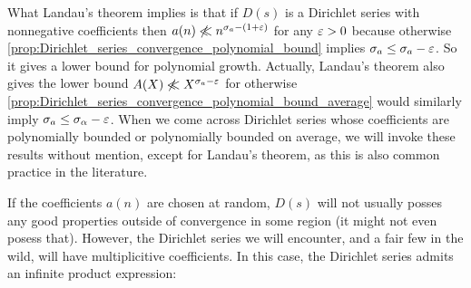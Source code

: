       What Landau's theorem implies is that if $D(s)$ is a Dirichlet series with nonnegative coefficients then $a(n) \not\ll n^{\sigma_{a}-(1+\varepsilon)}$ for any $\varepsilon > 0$ because otherwise \cref{prop:Dirichlet_series_convergence_polynomial_bound} implies $\sigma_{a} \le \sigma_{a}-\varepsilon$. So it gives a lower bound for polynomial growth. Actually, Landau's theorem also gives the lower bound $A(X) \not\ll X^{\sigma_{a}-\varepsilon}$ for otherwise \cref{prop:Dirichlet_series_convergence_polynomial_bound_average} would similarly imply $\sigma_{a} \le \sigma_{\alpha}-\varepsilon$. When we come across Dirichlet series whose coefficients are polynomially bounded or polynomially bounded on average, we will invoke these results without mention, except for Landau's theorem, as this is also common practice in the literature.

      If the coefficients $a(n)$ are chosen at random, $D(s)$ will not usually posses any good properties outside of convergence in some region (it might not even posess that). However, the Dirichlet series we will encounter, and a fair few in the wild, will have multiplicitive coefficients. In this case, the Dirichlet series admits an infinite product expression:

